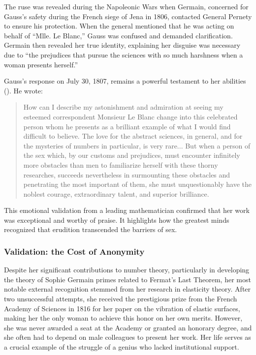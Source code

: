 The ruse was revealed during the Napoleonic Wars when Germain, concerned for Gauss's safety during the French siege of Jena in 1806, contacted General Pernety to ensure his protection. When the general mentioned that he was acting on behalf of ``Mlle. Le Blanc,'' Gauss was confused and demanded clarification. Germain then revealed her true identity, explaining her disguise was necessary due to ``the prejudices that pursue the sciences with so much harshness when a woman presents herself.''

Gauss's response on July 30, 1807, remains a powerful testament to her abilities (\cite{gray1978}). He wrote:
\begin{quote}
How can I describe my astonishment and admiration at seeing my esteemed correspondent Monsieur Le Blanc change into this celebrated person whom he presents as a brilliant example of what I would find difficult to believe. The love for the abstract sciences, in general, and for the mysteries of numbers in particular, is very rare... But when a person of the sex which, by our customs and prejudices, must encounter infinitely more obstacles than men to familiarize herself with these thorny researches, succeeds nevertheless in surmounting these obstacles and penetrating the most important of them, she must unquestionably have the noblest courage, extraordinary talent, and superior brilliance.
\end{quote}

This emotional validation from a leading mathematician confirmed that her work was exceptional and worthy of praise. It highlights how the greatest minds recognized that erudition transcended the barriers of sex.
\subsubsection{Validation: the Cost of Anonymity}

Despite her significant contributions to number theory, particularly in developing the theory of Sophie Germain primes related to Fermat's Last Theorem, her most notable external recognition stemmed from her research in elasticity theory. After two unsuccessful attempts, she received the prestigious prize from the French Academy of Sciences in 1816 for her paper on the vibration of elastic surfaces, making her the only woman to achieve this honor on her own merits. However, she was never awarded a seat at the Academy or granted an honorary degree, and she often had to depend on male colleagues to present her work. Her life serves as a crucial example of the struggle of a genius who lacked institutional support.

